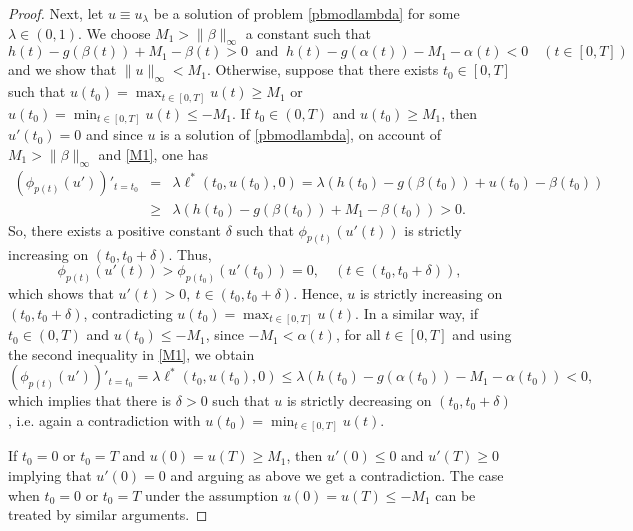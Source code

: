 \documentclass[10pt,a4paper]{amsart}
\begin{document}
\begin{proof}
Next, let $u \equiv u_{\lambda}$ be a solution of problem \eqref{pbmodlambda} for some $\lambda\in(0,1)$. We choose $M_1>\|\beta\|_\infty$ a constant such that
\begin{equation}\label{M1}
    h(t)-g(\beta(t))+M_1-\beta(t)>0\ \mbox{ and }\ h(t)-g(\alpha(t))-M_1-\alpha(t)<0 \quad (t\in[0,T])
\end{equation}
and we show that $\|u\|_\infty<M_1$. Otherwise, suppose that there exists $t_0\in[0,T]$ such that $u(t_0)=\max_{t\in[0,T]}u(t)\geq M_1$ or $u(t_0)=\min_{t\in[0,T]}u(t)\leq -M_1$.
If $t_0\in(0,T)$ and $u(t_0)\geq M_1$, then $u'(t_0)=0$ and since $u$ is a solution of \eqref{pbmodlambda}, on account of $M_1>\|\beta\|_\infty$ and \eqref{M1}, one has
\begin{eqnarray*}
  (\phi_{p(t)}(u'))'_{t=t_0} &=& \lambda\ell^*(t_0,u(t_0),0)=\lambda(h(t_0)-g(\beta(t_0))+u(t_0)-\beta(t_0)) \\
  &\geq& \lambda(h(t_0)-g(\beta(t_0))+M_1-\beta(t_0))>0.
\end{eqnarray*}
So, there exists a positive constant $\delta$ such that $\phi_{p(t)}(u'(t))$ is strictly increasing on $(t_0,t_0+\delta)$. Thus, $$\phi_{p(t)}(u'(t))>\phi_{p(t_0)}(u'(t_0))=0,\quad (t\in(t_0,t_0+\delta)),$$ which shows that $u'(t)>0,\ t\in (t_0,t_0+\delta)$. Hence, $u$ is strictly increasing on $(t_0,t_0+\delta)$, contradicting $u(t_0)=\max_{t\in[0,T]}u(t)$. In a similar way, if $t_0\in(0,T)$ and $u(t_0)\leq-M_1$, since $-M_1<\alpha(t)$, for all $t\in[0,T]$ and using the second inequality in \eqref{M1}, we obtain
$$(\phi_{p(t)}(u'))'_{t=t_0} = \lambda\ell^*(t_0,u(t_0),0)\leq\lambda(h(t_0)-g(\alpha(t_0))-M_1-\alpha(t_0))<0,$$
which implies that there is $\delta>0$ such that $u$ is strictly decreasing on $(t_0,t_0+\delta)$, i.e. again a contradiction with $u(t_0)=\min_{t\in[0,T]}u(t)$.

If $t_0=0$ or $t_0=T$ and $u(0)=u(T) \geq M_1$, then $u'(0) \leq 0$ and $u'(T) \geq 0$ implying that $u'(0)=0$ and arguing as above we get a contradiction. The case when $t_0=0$ or $t_0=T$ under the assumption $u(0)=u(T) \leq -M_1$ can be treated by similar arguments.


\end{proof}
\end{document}
